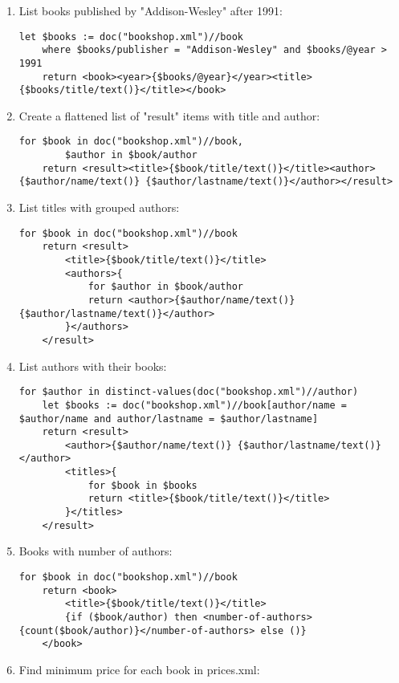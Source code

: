 \documentclass[twoside]{article}
\begin{document}
\begin{enumerate}
    \item List books published by "Addison-Wesley" after 1991:
    \begin{lstlisting}[style=xquery]
    let $books := doc("bookshop.xml")//book
    where $books/publisher = "Addison-Wesley" and $books/@year > 1991
    return <book><year>{$books/@year}</year><title>{$books/title/text()}</title></book>
    \end{lstlisting}
    \item Create a flattened list of "result" items with title and author:
    \begin{lstlisting}[style=xquery]
    for $book in doc("bookshop.xml")//book,
        $author in $book/author
    return <result><title>{$book/title/text()}</title><author>{$author/name/text()} {$author/lastname/text()}</author></result>
    \end{lstlisting}
    \item List titles with grouped authors:
    \begin{lstlisting}[style=xquery]
    for $book in doc("bookshop.xml")//book
    return <result>
        <title>{$book/title/text()}</title>
        <authors>{
            for $author in $book/author
            return <author>{$author/name/text()} {$author/lastname/text()}</author>
        }</authors>
    </result>
    \end{lstlisting}
    \item List authors with their books:
    \begin{lstlisting}[style=xquery]
    for $author in distinct-values(doc("bookshop.xml")//author)
    let $books := doc("bookshop.xml")//book[author/name = $author/name and author/lastname = $author/lastname]
    return <result>
        <author>{$author/name/text()} {$author/lastname/text()}</author>
        <titles>{
            for $book in $books
            return <title>{$book/title/text()}</title>
        }</titles>
    </result>
    \end{lstlisting}
    \item Books with number of authors:
    \begin{lstlisting}[style=xquery]
    for $book in doc("bookshop.xml")//book
    return <book>
        <title>{$book/title/text()}</title>
        {if ($book/author) then <number-of-authors>{count($book/author)}</number-of-authors> else ()}
    </book>
    \end{lstlisting}
    \item Find minimum price for each book in prices.xml:

\end{enumerate}
\end{document}

